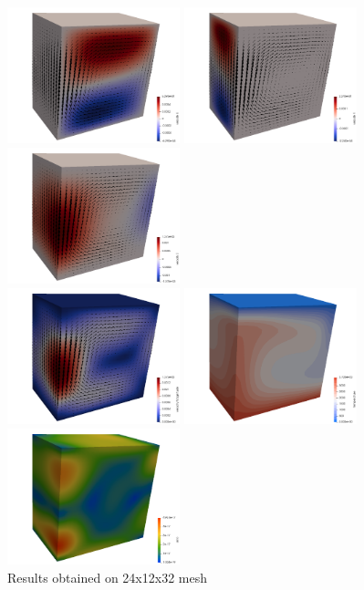 \begin{center}
\includegraphics[width=5cm]{python_codes/fieldstone_20/results/24x12x32_1p0/u}
\includegraphics[width=5cm]{python_codes/fieldstone_20/results/24x12x32_1p0/v}
\includegraphics[width=5cm]{python_codes/fieldstone_20/results/24x12x32_1p0/w}\\
\includegraphics[width=5cm]{python_codes/fieldstone_20/results/24x12x32_1p0/vel}
\includegraphics[width=5cm]{python_codes/fieldstone_20/results/24x12x32_1p0/T}
\includegraphics[width=5cm]{python_codes/fieldstone_20/results/24x12x32_1p0/sr}\\
{\captionfont Results obtained on 24x12x32 mesh}
\end{center}


